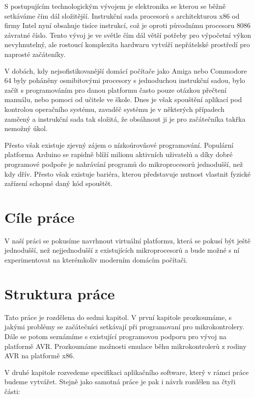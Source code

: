 \begin{introduction}

S postupujícím technologickým vývojem je elektronika se kterou se běžně setkáváme čím dál složitější. Instrukční sada procesorů s architekturou x86 od firmy Intel nyní obsahuje tisíce instrukcí\cite{x86-instructions}, což je oproti původnímu procesoru 8086\cite{8086-instructions} závratné číslo. Tento vývoj je ve světle čím dál větší potřeby pro výpočetní výkon nevyhnutelný, ale rostoucí komplexita hardwaru vytváří nepřátelské prostředí pro naprosté začáteníky.

V dobách, kdy nejsofistikovanější domácí počítače jako Amiga nebo Commodore 64 byly poháněny osmibitovými procesory s jednoduchou instrukční sadou, bylo začít s programováním pro danou platformu často pouze otázkou přečtení manuálu, nebo pomoci od učitele ve škole. Dnes je však spouštění aplikací pod kontrolou operačního systému, zavaděč systému je v některých případech zamčený a instrukční sada tak složitá, že obsáhnout ji je pro začátečníka takřka nemožný úkol.

Přesto však existuje zjevný zájem o nízkoúrovňové programování. Populární platforma Arduino se rapidně blíží milionu aktivních uživatelů a díky dobré programové podpoře je nahrávání programů do mikroprocesorů jednodušší, než kdy dřív. Přesto však existuje bariéra, kterou představuje nutnost vlastnit fyzické zařízení schopné daný kód spouštět.

\section{Cíle práce}

V naší práci se pokusíme navrhnout virtuální platformu, která se pokusí být ještě jednodušší, než nejjednodušší z existujících mikroprocesorů a bude možné s ní experimentovat na kterémkoliv moderním domácím počítači.

\section{Struktura práce}

Tato práce je rozdělena do sedmi kapitol. V první kapitole prozkoumáme, s jakými problémy se začátečníci setkávají při programovaní pro mikrokontrolery. Dále se potom seznámíme s existující programovou podporu pro vývoj na platformě AVR. Prozkoumáme možnosti emulace běhu mikrokontrolerů z rodiny AVR na platformě x86.

V druhé kapitole rozvedeme specifikaci aplikačního software, který v rámci práce budeme vytvářet. Stejně jako samotná práce je pak i návrh rozdělen na čtyři části:


\end{introduction}
